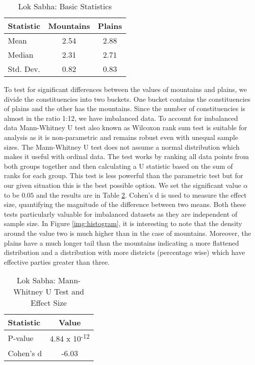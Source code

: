 \begin{table}[h]
\centering
\begin{tabular}{|l|c|c|}
\hline
Statistic & Mountains & Plains \\
\hline
Mean & 2.54 & 2.88 \\
Median & 2.31 & 2.71 \\
Std. Dev. & 0.82 & 0.83 \\
\hline
\end{tabular}
\caption{Lok Sabha: Basic Statistics}

\label{tab:basic_stats}
\end{table}
\begin{sloppypar}

To test for significant differences between the values of mountains and plains, we divide the constituencies into two buckets. One bucket contains the constituencies of plains and the other has the mountains. Since the number of constituencies is almost in the ratio 1:12, we have imbalanced data. To account for imbalanced data Mann-Whitney U test also known as  Wilcoxon rank sum test is suitable for analysis as it is non-parametric and remains robust even with unequal sample sizes. The Mann-Whitney U test does not assume a normal distribution which makes it  useful with ordinal data. The test works by ranking all data points from both groups together and then calculating a U statistic based on the sum of ranks for each group. This test is less powerful than the parametric test but for our given situation this is the best possible option. We set the significant value $\alpha$ to be $0.05$ and the results are in Table \ref{tab:stats_tests}. Cohen's d is used to measure the effect size, quantifying the magnitude of the difference between two means. Both these tests particularly valuable for imbalanced datasets as they are independent of sample size. In Figure \ref{img:histogram}, it is interesting to note that the density around the value two is much higher than in the case of mountains. Moreover, the plains have a much longer tail than the mountains indicating a more flattened distribution and a distribution with more districts (percentage wise) which have effective parties greater than three. 
\end{sloppypar}
\begin{table}[h]
\centering
\begin{tabular}{|l|c|}
\hline
Statistic & Value \\
\hline
P-value & 4.84 x 10\textsuperscript{-12} \\
Cohen's d & -6.03 \\
\hline
\end{tabular}
\label{tab:stats_tests}
\caption{Lok Sabha: Mann-Whitney U Test and Effect Size}

\end{table}


